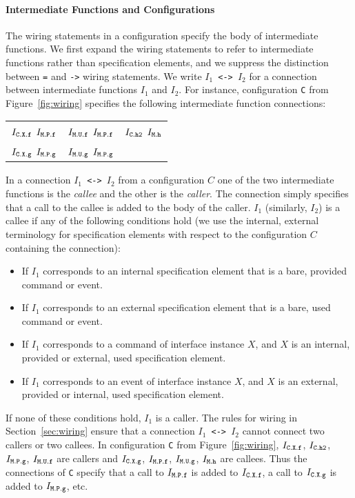 \documentclass[11pt,letterpaper]{article}
\newcommand{\code}[1]{{\tt #1}}
\begin{document}
\paragraph{Intermediate Functions and Configurations}

The wiring statements in a configuration specify the body of intermediate
functions. We first expand the wiring statements to refer to intermediate
functions rather than specification elements, and we suppress the
distinction between \code{=} and \code{->} wiring statements. We write
\code{$I_1$ <-> $I_2$} for a connection between intermediate functions
\code{$I_1$} and \code{$I_2$}. For instance, configuration \code{C} from
Figure~\ref{fig:wiring} specifies the following intermediate function
connections:\\
\begin{tabular}{ccc}
$I_\code{C.X.f}$ \code{<->} $I_\code{M.P.f}$ & 
$I_\code{M.U.f}$ \code{<->} $I_\code{M.P.f}$ & 
$I_\code{C.h2}$ \code{<->} $I_\code{M.h}$ \\
$I_\code{C.X.g}$ \code{<->} $I_\code{M.P.g}$ & 
$I_\code{M.U.g}$ \code{<->} $I_\code{M.P.g}$
\end{tabular}

In a connection \code{$I_1$ <-> $I_2$} from a configuration
$C$ one of the two intermediate functions is the \emph{callee} and the
other is the \emph{caller}. The connection simply specifies that a call to
the callee is added to the body of the caller. \code{$I_1$}
(similarly, \code{$I_2$}) is a callee if any of the following conditions hold
(we use the internal, external terminology for specification elements with
respect to the configuration $C$ containing the connection):
\begin{itemize}
\item If \code{$I_1$} corresponds to an internal specification element that
is a bare, provided command or event.
\item If \code{$I_1$} corresponds to an external specification element that
is a bare, used command or event.
\item If \code{$I_1$} corresponds to a command of interface instance $X$,
and $X$ is an internal, provided or external, used specification element.
\item If \code{$I_1$} corresponds to an event of interface instance $X$,
and $X$ is an external, provided or internal, used specification element.
\end{itemize}
If none of these conditions hold, \code{$I_1$} is a caller. The rules for
wiring in Section~\ref{sec:wiring} ensure that a connection \code{$I_1$ <->
$I_2$} cannot connect two callers or two callees. In configuration \code{C}
from Figure~\ref{fig:wiring}, $I_\code{C.X.f}$, $I_\code{C.h2}$,
$I_\code{M.P.g}$, $I_\code{M.U.f}$ are callers and $I_\code{C.X.g}$,
$I_\code{M.P.f}$, $I_\code{M.U.g}$, $I_\code{M.h}$ are callees. Thus the
connections of \code{C} specify that a call to $I_\code{M.P.f}$ is added to
$I_\code{C.X.f}$, a call to $I_\code{C.X.g}$ is added to $I_\code{M.P.g}$,
etc.
\end{document}
